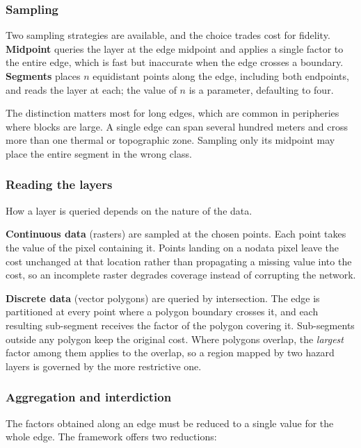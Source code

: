 \subsubsection{Sampling}

Two sampling strategies are available, and the choice trades cost for fidelity. \textbf{Midpoint} queries the layer at the edge midpoint and applies a single factor to the entire edge, which is fast but inaccurate when the edge crosses a boundary. \textbf{Segments} places $n$ equidistant points along the edge, including both endpoints, and reads the layer at each; the value of $n$ is a parameter, defaulting to four.

The distinction matters most for long edges, which are common in peripheries where blocks are large. A single edge can span several hundred meters and cross more than one thermal or topographic zone. Sampling only its midpoint may place the entire segment in the wrong class.

\subsubsection{Reading the layers}

How a layer is queried depends on the nature of the data.

\textbf{Continuous data} (rasters) are sampled at the chosen points. Each point takes the value of the pixel containing it. Points landing on a nodata pixel leave the cost unchanged at that location rather than propagating a missing value into the cost, so an incomplete raster degrades coverage instead of corrupting the network.

\textbf{Discrete data} (vector polygons) are queried by intersection. The edge is partitioned at every point where a polygon boundary crosses it, and each resulting sub-segment receives the factor of the polygon covering it. Sub-segments outside any polygon keep the original cost. Where polygons overlap, the \emph{largest} factor among them applies to the overlap, so a region mapped by two hazard layers is governed by the more restrictive one.

\subsubsection{Aggregation and interdiction}

The factors obtained along an edge must be reduced to a single value for the whole edge. The framework offers two reductions:

